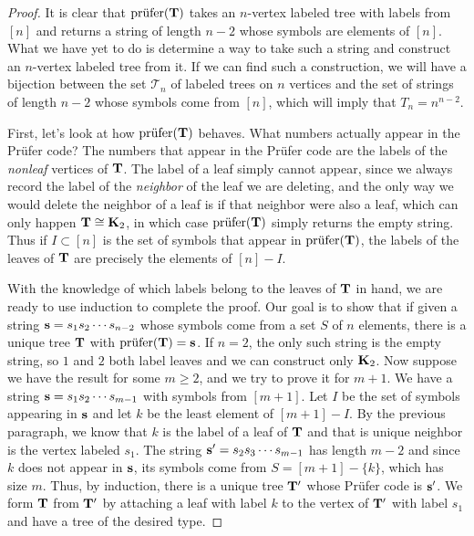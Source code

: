 \begin{proof}
  It is clear that $\mbox{pr\"ufer}(\mathbf{T})$ takes an $n$-vertex labeled tree
  with labels from $[n]$ and returns a string of length $n-2$ whose
  symbols are elements of $[n]$. What we have yet to do is determine a
  way to take such a string and construct an $n$-vertex labeled tree
  from it. If we can find such a construction, we will have a
  bijection between the set $\mathcal{T}_n$ of labeled trees on $n$
  vertices and the set of strings of length $n-2$ whose symbols come
  from $[n]$, which will imply that $T_n=n^{n-2}$.

  First, let's look at how $\mbox{pr\"ufer}(\mathbf{T})$ behaves. What numbers
  actually appear in the Pr\"ufer code? The numbers that appear in the
  Pr\"ufer code are the labels of the \textit{nonleaf} vertices of
  $\mathbf{T}$. The label of a leaf simply cannot appear, since we always
  record the label of the \textit{neighbor} of the leaf we are
  deleting, and the only way we would delete the neighbor of a leaf is
  if that neighbor were also a leaf, which can only happen
  $\mathbf{T}\cong\mathbf{K}_2$, in which case $\mbox{pr\"ufer}(\mathbf{T})$ simply returns the
  empty string. Thus if $I\subset [n]$ is the set of symbols that
  appear in $\mbox{pr\"ufer}(\mathbf{T})$, the labels of the leaves of $\mathbf{T}$ are
  precisely the elements of $[n]-I$.

  With the knowledge of which labels belong to the leaves of $\mathbf{T}$ in
  hand, we are ready to use induction to complete the proof. Our goal
  is to show that if given a string $\mathbf{s}=s_1s_2\cdots s_{n-2}$ whose
  symbols come from a set $S$ of $n$ elements, there is a unique tree
  $\mathbf{T}$ with $\mbox{pr\"ufer}(\mathbf{T}) = \mathbf{s}$. If $n=2$, the only such string
  is the empty string, so $1$ and $2$ both label leaves and we can
  construct only $\mathbf{K}_2$. Now suppose we have the result for some
  $m\geq 2$, and we try to prove it for $m+1$. We have a string $\mathbf{s}
  = s_1s_2\cdots s_{m-1}$ with symbols from $[m+1]$. Let $I$ be the
  set of symbols appearing in $\mathbf{s}$ and let $k$ be the least element
  of $[m+1]-I$. By the previous paragraph, we know that $k$ is the
  label of a leaf of $\mathbf{T}$ and that is unique neighbor is the vertex
  labeled $s_1$. The string $\mathbf{s}'=s_2s_3\cdots s_{m-1}$ has length
  $m-2$ and since $k$ does not appear in $\mathbf{s}$, its symbols come from
  $S=[m+1]-\{k\}$, which has size $m$. Thus, by induction, there is a
  unique tree $\mathbf{T}'$ whose Pr\"ufer code is $\mathbf{s}'$. We form $\mathbf{T}$
  from $\mathbf{T}'$ by attaching a leaf with label $k$ to the vertex of
  $\mathbf{T}'$ with label $s_1$ and have a tree of the desired type.
\end{proof}

